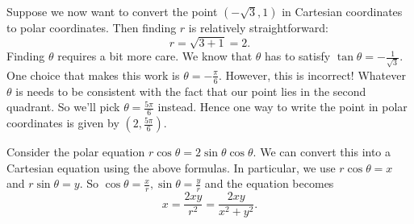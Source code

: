 \documentclass[10pt,]{book}
\theoremstyle{ptxplainnotitle}
\theoremstyle{ptxplaintitle}
\theoremstyle{ptxplainnotitle}
\theoremstyle{ptxplaintitle}
\theoremstyle{ptxplainnotitle}
\theoremstyle{ptxplaintitle}
\theoremstyle{ptxdefinitionnotitle}
\theoremstyle{ptxdefinitiontitle}
\theoremstyle{ptxdefinitionnotitle}
\theoremstyle{ptxdefinitiontitle}
\theoremstyle{ptxdefinitionnotitle}
\theoremstyle{ptxdefinitiontitle}
\theoremstyle{ptxdefinitionnotitle}
\theoremstyle{ptxdefinitiontitle}
\theoremstyle{ptxdefinitionnotitle}
\theoremstyle{ptxdefinitiontitle}
\numberwithin{equation}{section}
\begin{document}
\begin{example}\label{example-converting-cartesian-to-polar}
\hypertarget{p-681}{}%
Suppose we now want to convert the point \((-\sqrt{3},1)\) in Cartesian coordinates to polar coordinates. Then finding \(r\) is relatively straightforward:%
%
\begin{equation*}
r = \sqrt{3+1} = 2.
\end{equation*}
\hypertarget{p-682}{}%
Finding \(\theta\) requires a bit more care. We know that \(\theta\) has to satisfy \(\tan\theta = -\frac{1}{\sqrt{3}}\). One choice that makes this work is \(\theta = -\frac{\pi}{6}\). However, this is incorrect! Whatever \(\theta\) is needs to be consistent with the fact that our point lies in the second quadrant. So we'll pick \(\theta = \frac{5\pi}{6}\) instead. Hence one way to write the point in polar coordinates is given by \((2,\frac{5\pi}{6}).\)%
\end{example}
\begin{example}\label{example-converting-equations}
\hypertarget{p-683}{}%
Consider the polar equation \(r\cos\theta = 2\sin\theta\cos\theta\). We can convert this into a Cartesian equation using the above formulas. In particular, we use \(r\cos\theta = x\) and \(r\sin\theta = y\). So \(\cos\theta = \frac{x}{r}, \sin\theta = \frac{y}{r}\) and the equation becomes%
%
\begin{equation*}
x = \frac{2xy}{r^{2}} = \frac{2xy}{x^{2}+y^{2}}.
\end{equation*}
\end{example}
\typeout{************************************************}
\typeout{************************************************}
\end{document}
